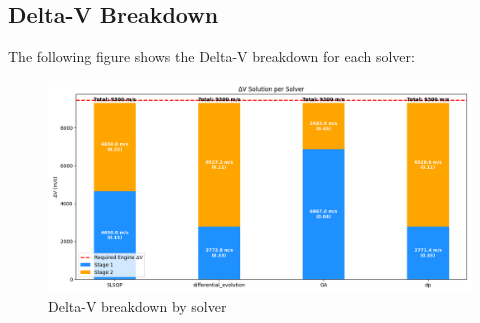 \documentclass{article}
\begin{document}
\subsection{Delta-V Breakdown}
The following figure shows the Delta-V breakdown for each solver:
\begin{figure}[H]
\centering
\includegraphics[width=\textwidth]{dv_breakdown.png}
\caption{Delta-V breakdown by solver}
\end{figure}
\end{document}
